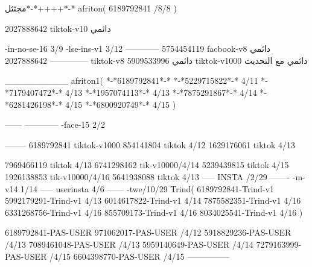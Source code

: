 مجثثل*-*++++*-*
afriton(
6189792841 /8/8
)

2027888642 tiktok-v10
دائمي

-in-no-se-16 3/9
-lse-ins-v1 3/12
------------
5754454119 facbook-v8
دائمي
--------------
2027888642 tiktok-v8
دائمي
5909533996 tiktok-v1000
دائمي مع التحديث

__________
afriton1(
*-*6189792841*-*
*-*5229715822*-* 4/11
*-*7179407472*-* 4/13
*-*1957074113*-* 4/13
*-*7875291867*-* 4/14
*-*6281426198*-* 4/15
*-*6800920749*-* 4/15
)


------
------------
-face-15 2/2

--------
6189792841 tiktok-v1000
854141804 tiktok 4/12
1629176061 tiktok 4/13

7969466119 tiktok 4/13
6741298162 tik-v10000/4/14
5239439815 tiktok 4/15
1926138853 tik-v10000/4/16
5641938088 tiktok 4/13
-----
 INSTA /2/29
-------
-m-v14 1/14
-----
userinsta 4/6
------
-twe/10/29
Trind(
6189792841-Trind-v1 
5992179291-Trind-v1  4/13
6014617822-Trind-v1  4/14
7875582351-Trind-v1  4/16
6331268756-Trind-v1  4/16
855709173-Trind-v1  4/16
8034025541-Trind-v1  4/16
)

6189792841-PAS-USER
971062017-PAS-USER /4/12
5918829236-PAS-USER /4/13
7089461048-PAS-USER /4/13
5959140649-PAS-USER /4/14
7279163999-PAS-USER /4/15
6604398770-PAS-USER /4/15
    ---------------
